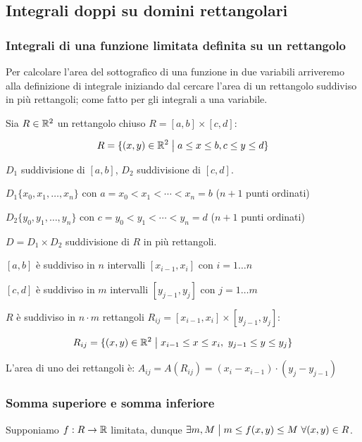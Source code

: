 \subsection{Integrali doppi su domini rettangolari}

\subsubsection{Integrali di una funzione limitata definita su un rettangolo}

Per calcolare l'area del sottografico di una funzione in due variabili arriveremo alla definizione di integrale iniziando dal cercare l'area di un rettangolo suddiviso in più rettangoli; come fatto per gli integrali a una variabile.

Sia \(R \in \mathbb{R}^2\) un rettangolo chiuso \(R = [a,b]\times [c,d]\):

\[
    R = \{(x,y) \in \mathbb{R}^2 \;\big|\; a \le x \le b, c \le y \le d \}
\]

\(D_1\) suddivisione di \([a,b]\), \(D_2\) suddivisione di \([c,d]\).

\(D_1 \{x_0,x_1,\ldots,x_n\} \) con \(a = x_0 < x_1 < \cdots < x_n = b\) (\(n+1\) punti ordinati)

\(D_2 \{y_0,y_1,\ldots,y_n\} \) con \(c = y_0 < y_1 < \cdots < y_n = d\) (\(n+1\) punti ordinati)


\(D = D_1 \times D_2\) suddivisione di \(R\) in più rettangoli.

\([a,b]\) è suddiviso in \(n\) intervalli \([x_{i-1}, x_i]\) con \(i = 1 \ldots n\)

\([c,d]\) è suddiviso in \(m\) intervalli \([y_{j-1}, y_j]\) con \(j = 1 \ldots m\)

\(R\) è suddiviso in \(n\cdot m\) rettangoli \(R_{ij} = [x_{i-1}, x_i] \times [y_{j-1}, y_j]\):

\[
    R_{ij} = \{(x,y) \in \mathbb{R}^2 \;\big|\; x_{i-1} \le x \le x_i,\ y_{j-1} \le  y \le y_j\}
\]

L'area di uno dei rettangoli è: \(A_{ij} = A(R_{ij}) = (x_i - x_{i-1}) \cdot (y_j - y_{j-1})\)

\filbreak{}
\subsubsection{Somma superiore e somma inferiore}

Supponiamo \(f: R \to \mathbb{R} \) limitata, dunque \(\exists m,M \;\big|\; m \le f(x,y) \le M ~\forall (x,y) \in R\).

